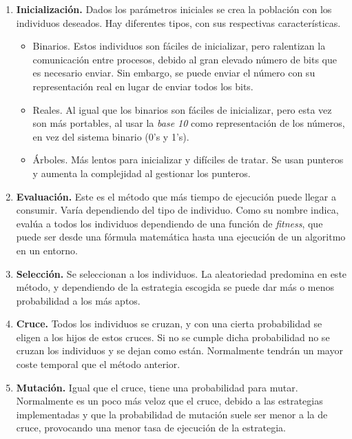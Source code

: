 	\begin{enumerate}
		\item \textbf{Inicialización.} Dados los parámetros iniciales se crea la población con los individuos deseados. Hay diferentes tipos, con sus respectivas características.
		\begin{itemize}
			\item Binarios. Estos individuos son fáciles de inicializar, pero ralentizan la comunicación entre procesos, debido al gran elevado número de bits que es necesario enviar. Sin embargo, se puede enviar el número con su representación real en lugar de enviar todos los bits.
			\item Reales. Al igual que los binarios son fáciles de inicializar, pero esta vez son más portables, al usar la \textit{base 10} como representación de los números, en vez del sistema binario (0's y 1's). 
			\item Árboles. Más lentos para inicializar y difíciles de tratar. Se usan punteros y aumenta la complejidad al gestionar los punteros.
		\end{itemize}
		
		\item \textbf{Evaluación.} Este es el método que más tiempo de ejecución puede llegar a consumir. Varía dependiendo del tipo de individuo. Como su nombre indica, evalúa a todos los individuos dependiendo de una función de \textit{fitness}, que puede ser desde una fórmula matemática hasta una ejecución de un algoritmo en un entorno.
		
		\item \textbf{Selección.} Se seleccionan a los individuos. La aleatoriedad predomina en este método, y dependiendo de la estrategia escogida se puede dar más o menos probabilidad a los más aptos. 
		
		\item \textbf{Cruce.} Todos los individuos se cruzan, y con una cierta probabilidad se eligen a los hijos de estos cruces. Si no se cumple dicha probabilidad no se cruzan los individuos y se dejan como están. Normalmente tendrán un mayor coste temporal que el método anterior.
		
		\item \textbf{Mutación.} Igual que el cruce, tiene una probabilidad para mutar. Normalmente es un poco más veloz que el cruce, debido a las estrategias implementadas y que la probabilidad de mutación suele ser menor a la de cruce, provocando una menor tasa de ejecución de la estrategia.
	\end{enumerate}
	
